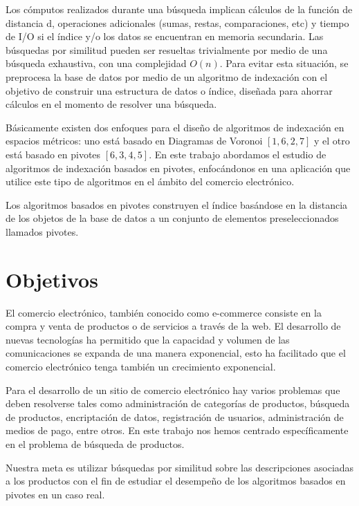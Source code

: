 Los c\'omputos realizados durante una b\'usqueda implican c\'alculos de la funci\'on de distancia d, operaciones adicionales (sumas, restas, comparaciones, etc) y tiempo de I/O si el \'indice y/o los datos se encuentran en memoria secundaria. Las b\'usquedas por similitud pueden ser resueltas trivialmente por medio de una b\'usqueda exhaustiva, con una complejidad $O(n)$. Para evitar esta situaci\'on, se preprocesa la base de datos por medio de un algoritmo de indexaci\'on con el objetivo de construir una estructura de datos o \'indice, diseñada para ahorrar c\'alculos en el momento de resolver una b\'usqueda. 
					
B\'asicamente existen dos enfoques para el diseño de algoritmos de indexaci\'on en espacios m\'etricos: uno est\'a basado en Diagramas de Voronoi $[1, 6, 2, 7]$ y el otro est\'a basado en pivotes $[6, 3, 4, 5]$. En este trabajo abordamos el estudio de algoritmos de indexaci\'on basados en pivotes, enfoc\'andonos en una aplicaci\'on que utilice este tipo de algoritmos en el \'ambito del comercio electr\'onico.
					
Los algoritmos basados en pivotes construyen el \'indice bas\'andose en la distancia de los objetos de la base de datos a un conjunto de elementos preseleccionados llamados pivotes. 	

\section{Objetivos}

El comercio electr\'onico, tambi\'en conocido como e-commerce consiste en la compra y venta de productos o de servicios a trav\'es de la web. El desarrollo de nuevas tecnolog\'ias ha permitido que la capacidad y volumen de las comunicaciones se expanda de una manera exponencial, esto ha facilitado que el comercio electr\'onico tenga tambi\'en un crecimiento exponencial.
					
Para el desarrollo de un sitio de comercio electr\'onico hay varios problemas que deben resolverse tales como administraci\'on de categor\'ias de productos, b\'usqueda de productos, encriptaci\'on de datos, registraci\'on de usuarios, administraci\'on de medios de pago, entre otros. En este trabajo nos hemos centrado espec\'ificamente en el problema de b\'usqueda de productos.
					
Nuestra meta es utilizar b\'usquedas por similitud sobre las descripciones asociadas a los productos con el fin de estudiar el desempeño de los algoritmos basados en pivotes en un caso real. 

